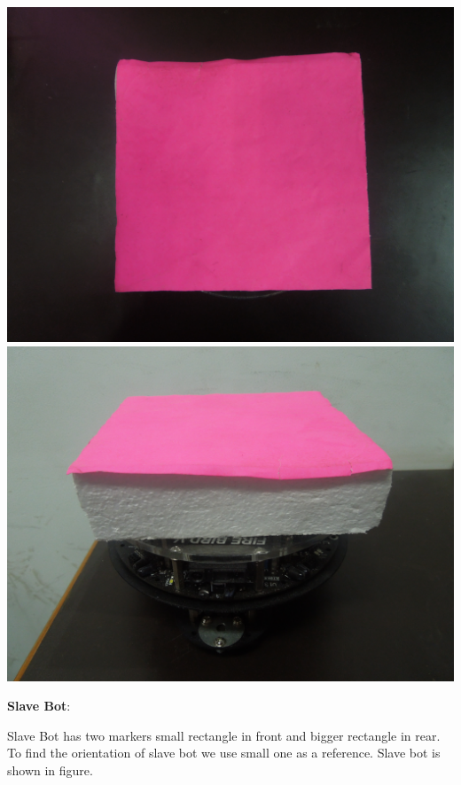 \documentclass[report]{res}
\begin{document}
	\begin{center}  
		\includegraphics[scale = 0.05]{graphics/pics/DSCN0034.jpg} 
		\includegraphics[scale = 0.05]{graphics/pics/DSCN0038.jpg}
	\end{center}
	
	\pagebreak	
	
	
	\textbf{\large Slave Bot}:	
	
	Slave Bot has two markers small rectangle in front and bigger rectangle in rear. To find the orientation of slave bot we use small one as a reference. Slave bot is shown in figure.\\	
	
\end{document}
